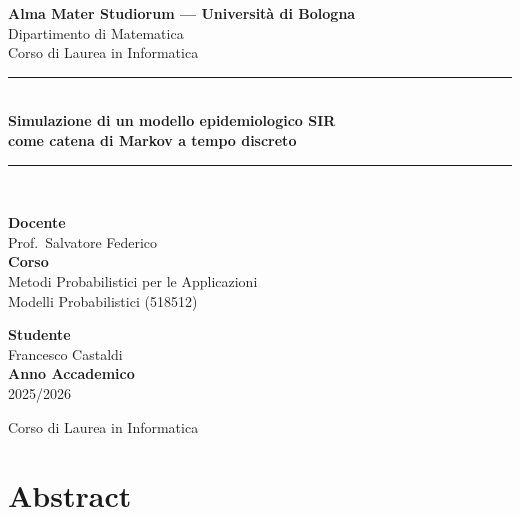 \documentclass[11pt, a4paper]{article}
\theoremstyle{plain}
\theoremstyle{definition}
\theoremstyle{remark}
\begin{document}

\begin{titlepage}
  \centering
  \vspace*{2cm}
  {\Large\bfseries Alma Mater Studiorum — Università di Bologna}\\[0.4cm]
  {\large Dipartimento di Matematica}\\[0.3cm]
  {\large Corso di Laurea in Informatica}\\[2cm]

  \rule{\linewidth}{0.5pt}\\[0.4cm]
  {\LARGE\bfseries Simulazione di un modello epidemiologico SIR}\\[0.3cm]
  {\LARGE\bfseries come catena di Markov a tempo discreto}\\[0.4cm]
  \rule{\linewidth}{0.5pt}\\[2cm]

  \begin{minipage}{0.48\textwidth}
    \begin{flushleft}
      \textbf{Docente}\\
      Prof.\ Salvatore Federico\\[0.3cm]
      \textbf{Corso}\\
      Metodi Probabilistici per le Applicazioni\\
      Modelli Probabilistici (518512)
    \end{flushleft}
  \end{minipage}
  \hfill
  \begin{minipage}{0.48\textwidth}
    \begin{flushright}
      \textbf{Studente}\\
      Francesco Castaldi\\[0.3cm]
      \textbf{Anno Accademico}\\
      2025/2026
    \end{flushright}
  \end{minipage}

  \vfill
  {\large Corso di Laurea in Informatica}
\end{titlepage}

\tableofcontents
\newpage

\section*{Abstract}
\end{document}
